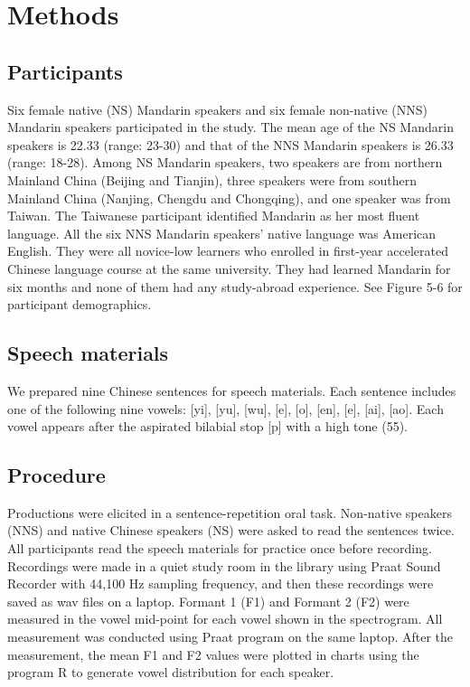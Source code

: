 \documentclass[man, fleqn, noextraspace]{apa6}
\begin{document}
\section{Methods}\label{methods}

\subsection{Participants}\label{participants}

Six female native (NS) Mandarin speakers and six female non-native (NNS)
Mandarin speakers participated in the study. The mean age of the NS
Mandarin speakers is 22.33 (range: 23-30) and that of the NNS Mandarin
speakers is 26.33 (range: 18-28). Among NS Mandarin speakers, two
speakers are from northern Mainland China (Beijing and Tianjin), three
speakers were from southern Mainland China (Nanjing, Chengdu and
Chongqing), and one speaker was from Taiwan. The Taiwanese participant
identified Mandarin as her most fluent language. All the six NNS
Mandarin speakers' native language was American English. They were all
novice-low learners who enrolled in first-year accelerated Chinese
language course at the same university. They had learned Mandarin for
six months and none of them had any study-abroad experience. See Figure
5-6 for participant demographics.

\subsection{Speech materials}\label{speech-materials}

We prepared nine Chinese sentences for speech materials. Each sentence
includes one of the following nine vowels: {[}yi{]}, {[}yu{]}, {[}wu{]},
{[}e{]}, {[}o{]}, {[}en{]}, {[}e{]}, {[}ai{]}, {[}ao{]}. Each vowel
appears after the aspirated bilabial stop {[}p{]} with a high tone (55).

\subsection{Procedure}\label{procedure}

Productions were elicited in a sentence-repetition oral task. Non-native
speakers (NNS) and native Chinese speakers (NS) were asked to read the
sentences twice. All participants read the speech materials for practice
once before recording. Recordings were made in a quiet study room in the
library using Praat Sound Recorder with 44,100 Hz sampling frequency,
and then these recordings were saved as wav files on a laptop. Formant 1
(F1) and Formant 2 (F2) were measured in the vowel mid-point for each
vowel shown in the spectrogram. All measurement was conducted using
Praat program on the same laptop. After the measurement, the mean F1 and
F2 values were plotted in charts using the program R to generate vowel
distribution for each speaker.
\end{document}
